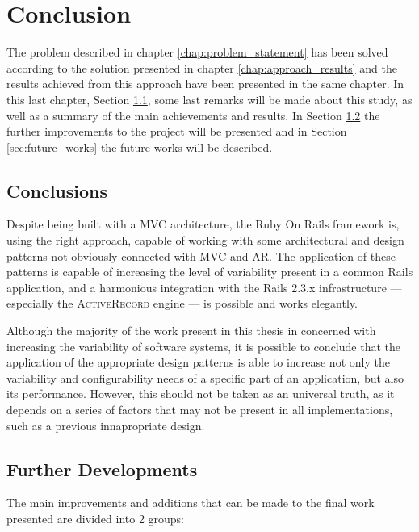 \chapter{Conclusion}\label{chap:conclusion}

The problem described in chapter \ref{chap:problem_statement} has been solved according to the solution presented in chapter \ref{chap:approach_results} and the results achieved from this approach have been presented in the same chapter. In this last chapter, Section \ref{sec:conclusions}, some last remarks will be made about this study, as well as a summary of the main achievements and results. In Section \ref{sec:further_developments} the further improvements to the project will be presented and in Section \ref{sec:future_works} the future works will be described.

\section{Conclusions}\label{sec:conclusions}

Despite being built with a MVC architecture, the Ruby On Rails framework is, using the right approach, capable of working with some architectural and design patterns not obviously connected with MVC and AR. The application of these patterns is capable of increasing the level of variability present in a common Rails application, and a harmonious integration with the Rails 2.3.x infrastructure --- especially the \textsc{ActiveRecord} engine --- is possible and works elegantly.

Although the majority of the work present in this thesis in concerned with increasing the variability of software systems, it is possible to conclude that the application of the appropriate design patterns is able to increase not only the variability and configurability needs of a specific part of an application, but also its performance. However, this should not be taken as an universal truth, as it depends on a series of factors that may not be present in all implementations, such as a previous innapropriate design.

\section{Further Developments}\label{sec:further_developments}

The main improvements and additions that can be made to the final work presented are divided into 2 groups:

